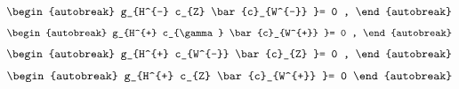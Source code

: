 \begin{align}
\begin{autobreak}
g_{H^{-} c_{Z} \bar{c}_{W^{-}} }=
	0
	,
\end{autobreak}
\end{align}
\begin{align}
\begin{autobreak}
g_{H^{+} c_{\gamma} \bar{c}_{W^{+}} }=
	0
	,
\end{autobreak}
\end{align}
\begin{align}
\begin{autobreak}
g_{H^{+} c_{W^{-}} \bar{c}_{Z} }=
	0
	,
\end{autobreak}
\end{align}
\begin{align}
\begin{autobreak}
g_{H^{+} c_{Z} \bar{c}_{W^{+}} }=
	0
	
\end{autobreak}
\end{align}

